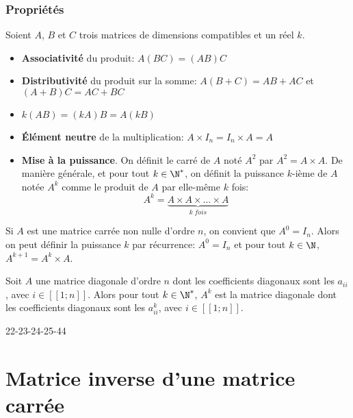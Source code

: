 \documentclass[a4paper]{article}
\begin{document}
\subsubsection{Propriétés}

\begin{propriete}{}{}
Soient $A$, $B$ et $C$ trois matrices de dimensions compatibles et un réel $k$.

\begin{itemize}[label=\textbullet]
	\item \textbf{Associativité} du produit: $A(BC)=(AB)C$
	\item \textbf{Distributivité} du produit sur la somme: $A(B+C)=AB+AC$ et $(A+B)C=AC+BC$
	\item $k(AB)= (kA)B=A(kB)$
	\item \textbf{Élément neutre} de la multiplication: $A \times I_n=I_n \times A =A$
	\item \textbf{Mise à la puissance}. On définit le carré de $A$ noté $A^2$ par $A^2=A \times A$. De manière générale, et pour tout $k \in \N^*$, on définit la puissance $k$-ième de $A$ notée $A^k$ comme le produit de $A$ par elle-même $k$ fois:
	$$A^k=\underbrace{A \times A \times \ldots \times A	}_{k \; fois}$$
\end{itemize}
	
\end{propriete}


\begin{remark}{}{}
	Si $A$ est une matrice carrée non nulle d'ordre $n$, on convient que $A^0=I_n$. Alors on peut définir la puissance $k$ par récurrence: $A^0=I_n$ et pour tout $k\in\N$, $A^{k+1}=A^k \times A$.

\end{remark}

\begin{propriete}{}{}
	Soit $A$ une matrice diagonale d'ordre $n$ dont les coefficients diagonaux sont les $a_{ii}$, avec $i \in [\![1;n]\!] $. Alors pour tout $k\in\N^*$, $A^k$ est la matrice diagonale dont les coefficients diagonaux sont les $a_{ii}^k$, avec $i \in [\![1;n]\!] $.
\end{propriete}


\begin{exercices}{}{}
	22-23-24-25-44
\end{exercices}

\section{Matrice inverse d'une matrice carrée}
\end{document}
